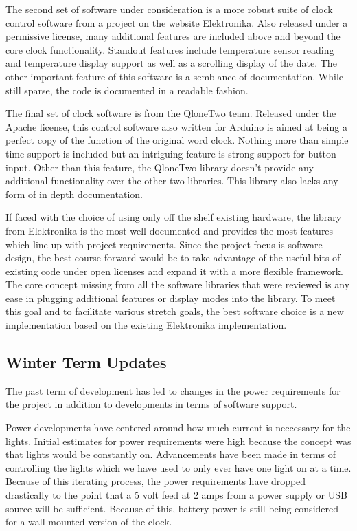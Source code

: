 \documentclass[onecolumn, draftclsnofoot,10pt, compsoc]{IEEEtran}
\begin{document}
The second set of software under consideration is a more robust suite of clock control software from a project on the website Elektronika.
Also released under a permissive license, many additional features are included above and beyond the core clock functionality. \cite{software2}
Standout features include temperature sensor reading and temperature display support as well as a scrolling display of the date.
The other important feature of this software is a semblance of documentation.
While still sparse, the code is documented in a readable fashion.

The final set of clock software is from the QloneTwo team.
Released under the Apache license, this control software also written for Arduino is aimed at being a perfect copy of the function of the original word clock.
Nothing more than simple time support is included but an intriguing feature is strong support for button input. \cite{software3}
Other than this feature, the QloneTwo library doesn’t provide any additional functionality over the other two libraries.
This library also lacks any form of in depth documentation.

If faced with the choice of using only off the shelf existing hardware, the library from Elektronika is the most well documented and provides the most features which line up with project requirements.
Since the project focus is software design, the best course forward would be to take advantage of the useful bits of existing code under open licenses and expand it with a more flexible framework.
The core concept missing from all the software libraries that were reviewed is any ease in plugging additional features or display modes into the library.
To meet this goal and to facilitate various stretch goals, the best software choice is a new implementation based on the existing Elektronika implementation.

\subsection{Winter Term Updates}
The past term of development has led to changes in the power requirements for the project in addition to developments in terms of software support.

Power developments have centered around how much current is neccessary for the lights.
Initial estimates for power requirements were high because the concept was that lights would be constantly on.
Advancements have been made in terms of controlling the lights which we have used to only ever have one light on at a time.
Because of this iterating process, the power requirements have dropped drastically to the point that a 5 volt feed at 2 amps from a power supply or USB source will be sufficient.
Because of this, battery power is still being considered for a wall mounted version of the clock.
\end{document}
